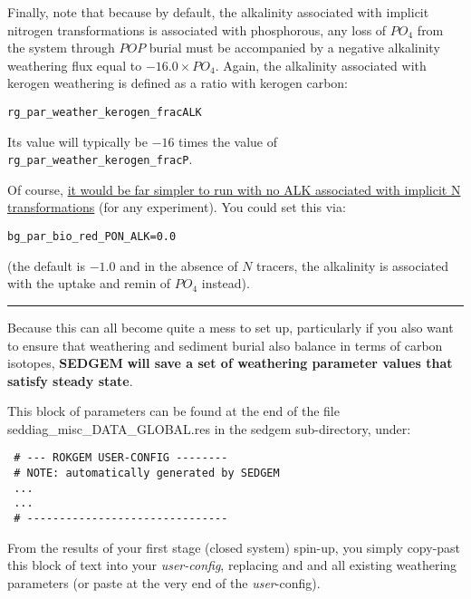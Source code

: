 \begin{enumerate}
\vspace{1mm}
Finally, note that because by default, the alkalinity associated with implicit nitrogen transformations is associated with phosphorous, any loss of \(PO_{4}\) from the system through \(POP\) burial must be accompanied by a negative alkalinity weathering flux equal to \(-16.0\times PO_{4}\). Again, the alkalinity associated with kerogen weathering is defined as a ratio with kerogen carbon:
\vspace{-1mm}\small\begin{verbatim}
rg_par_weather_kerogen_fracALK
\end{verbatim}\normalsize\vspace{-1mm} 
Its value will typically be \(-16\) times the value of \texttt{rg\_par\_weather\_kerogen\_fracP}.

\vspace{1mm}
Of course, \uline{it would be far simpler to run with no ALK associated with implicit N transformations} (for any experiment). You could set this via:
\vspace{-1mm}\small\begin{verbatim}
bg_par_bio_red_PON_ALK=0.0
\end{verbatim}\normalsize\vspace{-1mm} 
(the default is \(-1.0\) and in the absence of \(N\) tracers, the alkalinity is associated with the uptake and remin of \(PO_{4}\) instead).

\noindent\rule{4cm}{0.5pt}
\vspace{2mm}

Because this can all become quite a mess to set up, particularly if you also want to ensure that weathering and sediment burial also balance in terms of carbon isotopes, \textbf{SEDGEM} \textbf{will save a set of weathering parameter values that satisfy steady state}. 

\vspace{1mm}
This block of parameters can be found at the end of the file \textsf{\footnotesize seddiag\_misc\_DATA\_GLOBAL.res} in the \textsf{\footnotesize sedgem} sub-directory, under:
\vspace{-0mm}\footnotesize\begin{verbatim}
 # --- ROKGEM USER-CONFIG --------
 # NOTE: automatically generated by SEDGEM
 ...
 ...
 # -------------------------------
\end{verbatim}\normalsize\vspace{-0mm}

From the results of your first stage (closed system) spin-up, you simply copy-past this block of text into your \textit{user-config}, replacing and and all existing weathering parameters (or paste at the very end of the \textit{user}-config).


\end{enumerate}

